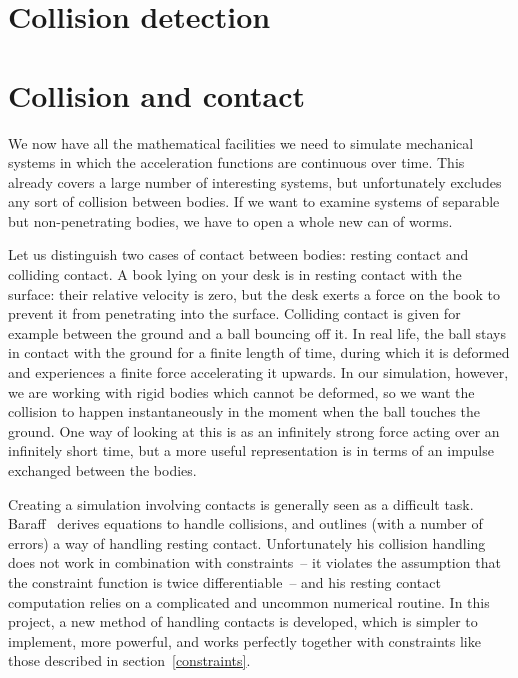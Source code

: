 \section{Collision detection\label{collisionDetection}}

\section{Collision and contact\label{collisionHandling}}

We now have all the mathematical facilities we need to simulate mechanical systems in which
the acceleration functions are continuous over time. This already covers a large number of
interesting systems, but unfortunately excludes any sort of collision between bodies. If we want
to examine systems of separable but non-penetrating bodies, we have to open a whole new can of
worms.

Let us distinguish two cases of contact between bodies: resting contact and colliding contact.
A book lying on your desk is in resting contact with the surface: their relative velocity is zero,
but the desk exerts a force on the book to prevent it from penetrating into the surface.
Colliding contact is given for example between the ground and a ball bouncing off it. In real
life, the ball stays in contact with the ground for a finite length of time, during which it is
deformed and experiences a finite force accelerating it upwards. In our simulation, however, we
are working with rigid bodies which cannot be deformed, so we want the collision to happen
instantaneously in the moment when the ball touches the ground. One way of looking at this is as
an infinitely strong force acting over an infinitely short time, but a more useful representation
is in terms of an impulse exchanged between the bodies.

Creating a simulation involving contacts is generally seen as a difficult task.
Baraff~\cite{BaraffWitkin:97} derives equations to handle collisions, and outlines (with a number
of errors) a way of handling resting contact. Unfortunately his collision handling does not work
in combination with constraints~-- it violates the assumption that the constraint function is
twice differentiable~-- and his resting contact computation relies on a complicated and uncommon
numerical routine. In this project, a new method of handling contacts is developed, which is
simpler to implement, more powerful, and works perfectly together with constraints like those
described in section~\ref{constraints}.

